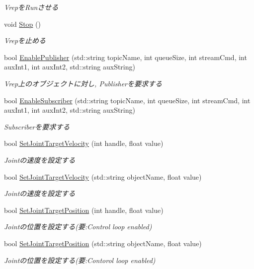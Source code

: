 \begin{DoxyCompactItemize}
\begin{DoxyCompactList}\small\item\em Vrepを\-Runさせる \end{DoxyCompactList}\item 
\hypertarget{classMyVrep_a387d7d9d10e95262e702ca4ff359ce43}{void \hyperlink{classMyVrep_a387d7d9d10e95262e702ca4ff359ce43}{Stop} ()}\label{classMyVrep_a387d7d9d10e95262e702ca4ff359ce43}

\begin{DoxyCompactList}\small\item\em Vrepを止める \end{DoxyCompactList}\item 
bool \hyperlink{classMyVrep_a8061008dfc3351fdafe0fb3358fb9388}{Enable\-Publisher} (std\-::string topic\-Name, int queue\-Size, int stream\-Cmd, int aux\-Int1, int aux\-Int2, std\-::string aux\-String)
\begin{DoxyCompactList}\small\item\em Vrep上のオブジェクトに対し, Publisherを要求する \end{DoxyCompactList}\item 
bool \hyperlink{classMyVrep_a734773fc7f7d689c40b5b37c52b3a6fd}{Enable\-Subscriber} (std\-::string topic\-Name, int queue\-Size, int stream\-Cmd, int aux\-Int1, int aux\-Int2, std\-::string aux\-String)
\begin{DoxyCompactList}\small\item\em Subscriberを要求する \end{DoxyCompactList}\item 
bool \hyperlink{classMyVrep_a9e1258779476a3a542c645bc459f15e8}{Set\-Joint\-Target\-Velocity} (int handle, float value)
\begin{DoxyCompactList}\small\item\em Jointの速度を設定する \end{DoxyCompactList}\item 
bool \hyperlink{classMyVrep_aca1cfd8c74c214136c5a702e99f06ec9}{Set\-Joint\-Target\-Velocity} (std\-::string object\-Name, float value)
\begin{DoxyCompactList}\small\item\em Jointの速度を設定する　 \end{DoxyCompactList}\item 
bool \hyperlink{classMyVrep_a6da9c0dcdcfad80b1a1d0ef52a20ca7a}{Set\-Joint\-Target\-Position} (int handle, float value)
\begin{DoxyCompactList}\small\item\em Jointの位置を設定する(要\-:Control loop enabled) \end{DoxyCompactList}\item 
bool \hyperlink{classMyVrep_aa3d6f6c9c133363f665af16932329ed6}{Set\-Joint\-Target\-Position} (std\-::string object\-Name, float value)
\begin{DoxyCompactList}\small\item\em Jointの位置を設定する(要\-:Contorol loop enabled) \end{DoxyCompactList}\end{DoxyCompactItemize}


